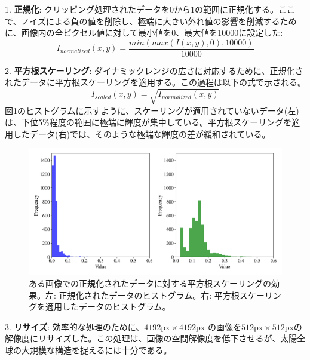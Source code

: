     1. \textbf{正規化}: クリッピング処理されたデータを0から1の範囲に正規化する。ここで、ノイズによる負の値を削除し、極端に大きい外れ値の影響を削減するために、画像内の全ピクセル値に対して最小値を0、最大値を10000に設定した:
       \begin{equation}
       I_{normalized}(x, y) = \frac{min(max(I(x,y), 0), 10000)}{10000}
       \end{equation}

    2. \textbf{平方根スケーリング}: ダイナミックレンジの広さに対応するために、正規化されたデータに平方根スケーリングを適用する。この過程は以下の式で示される。
       \begin{equation}
       I_{scaled}(x, y) = \sqrt{I_{normalized}(x, y)}
       \end{equation}
        図\ref{fig:scale_histogram}のヒストグラムに示すように、スケーリングが適用されていないデータ(左)は、下位5\%程度の範囲に極端に輝度が集中している。平方根スケーリングを適用したデータ(右)では、そのような極端な輝度の差が緩和されている。

    \begin{figure}[htbp]
        \centering
        \includegraphics[width=\linewidth]{figures/data/histogram.png}
        \caption{ある画像での正規化されたデータに対する平方根スケーリングの効果。左: 正規化されたデータのヒストグラム。右: 平方根スケーリングを適用したデータのヒストグラム。}
        \label{fig:scale_histogram}
    \end{figure}

    3. \textbf{リサイズ}: 効率的な処理のために、$4192\text{px} \times 4192\text{px}$ の画像を$512\text{px} \times 512\text{px}$の解像度にリサイズした。この処理は、画像の空間解像度を低下させるが、太陽全球の大規模な構造を捉えるには十分である。



